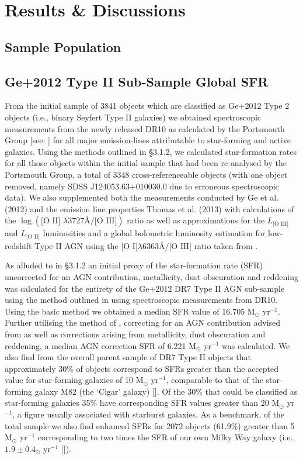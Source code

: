 \section{Results \& Discussions}
\subsection{Sample Population}
\subsection{Ge+2012 Type II Sub-Sample Global SFR}

From the initial sample of 3841 objects which are classified as Ge+2012 Type 2 objects (i.e., binary Seyfert Type II galaxies) we obtained spectroscopic measurements from the newly released DR10 as calculated by the Portsmouth Group [see: \cite{Thomas_2013}] for all major emission-lines attributable to star-forming and active galaxies. Using the methods outlined in §3.1.2, we calculated star-formation rates for all those objects within the initial sample that had been re-analysed by the Portsmouth Group, a total of 3348 cross-referenceable objects (with one object removed, namely SDSS J124053.63+010030.0 due to erroneous spectroscopic data). We also supplemented both the measurements conducted by Ge et al. (2012) and the emission line properties Thomas et al. (2013) with calculations of the $\log{(\text{[O II] }{\lambda}3727Å\text{/[O III]})}$ ratio as well as approximations for the $L_{\text{[O III]}}$ and $L_{\text{[O II]}}$ luminosities and a global bolometric luminosity estimation for low-redshift Type II AGN using the $\text{[O I]}\lambda6363Å/\text{[O III]}$ ratio taken from \cite{Netzer_2009}.         

As alluded to in §3.1.2 an initial proxy of the star-formation rate (SFR) uncorrected for an AGN contribution, metallicity, dust obscuration and reddening was calculated for the entirety of the Ge+2012 DR7 Type II AGN sub-sample using the method outlined in \cite{Kennicutt_1998} using spectroscopic measurements from DR10. Using the basic \cite{Kennicutt_1998} method we obtained a median SFR value of 16.705 M$_{\odot}$ yr$^{-1}$. Further utilising the method of \cite{Kewley_2004}, correcting for an AGN contribution advised from \cite{2006ApJ...642..702K} as well as corrections arising from metallicity, dust obscuration and reddening, a median AGN correction SFR of 6.221 M$_{\odot}$ yr$^{-1}$ was calculated. We also find from the overall parent sample of DR7 Type II objects that approximately 30\% of objects correspond to SFRs greater than the accepted value for star-forming galaxies of 10 M$_{\odot}$ yr$^{-1}$, comparable to that of the star-forming galaxy M82 (the ‘Cigar’ galaxy) [\cite{2009ApJ...706.1364F}]. Of the 30\% that could be classified as star-forming galaxies 35\% have corresponding SFR values greater than 20 M$_{\odot}$ yr$^{-1}$, a figure usually associated with starburst galaxies. As a benchmark, of the total sample we also find enhanced SFRs for 2072 objects (61.9\%) greater than 5 M$_{\odot}$ yr$^{-1}$ corresponding to two times the SFR of our own Milky Way galaxy (i.e., $1.9\pm{0.4}$$_{\odot}$ yr$^{-1}$ [\cite{2011AJ....142..197C}]).  

